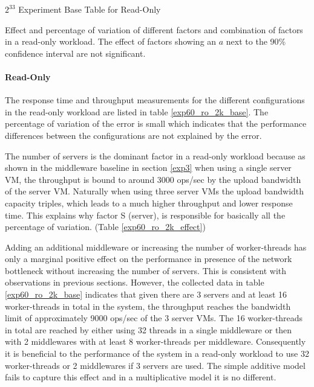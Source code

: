 \documentclass[report.tex]{subfiles}
\begin{document}
\begin{table}
	\centering
	\small{
		\setlength{\tabcolsep}{4.7pt}
		
		\caption{$2^33$ Experiment Base Table for Read-Only}\label{exp60_ro_2k_base} 
	}
\end{table}



\begin{table}
	\small{
		\centering
		\setlength{\tabcolsep}{4.5pt}
		\newcommand{\rlft}[0]{\raggedleft\arraybackslash}
		
		\caption{Effect and percentage of variation of different factors and combination of factors in a read-only workload. The effect of factors showing an $a$ next to the 90\% confidence interval are not significant.}\label{exp60_ro_2k_effect}
	}
\end{table}

\paragraph{Read-Only}

The response time and throughput measurements for the different configurations in the read-only workload are listed in table \ref{exp60_ro_2k_base}. The percentage of variation of the error is small which indicates that the performance differences between the configurations are not explained by the error. 

The number of servers is the dominant factor in a read-only workload because as shown in the middleware baseline in section \ref{exp3} when using a single server VM, the throughput is bound to around 3000 ops/sec by the upload bandwidth of the server VM. Naturally when using three server VMs the upload bandwidth capacity triples, which leads to a much higher throughput and lower response time. This explains why factor S (server), is responsible for basically all the percentage of variation. (Table \ref{exp60_ro_2k_effect})

Adding an additional middleware or increasing the number of worker-threads has only a marginal positive effect on the performance in presence of the network bottleneck without increasing the number of servers. This is consistent with observations in previous sections. 
However, the collected data in table \ref{exp60_ro_2k_base} indicates that given there are 3 servers and at least 16 worker-threads in total in the system, the throughput reaches the bandwidth limit of approximately 9000 ops/sec of the 3 server VMs. The 16 worker-threads in total are reached by either using 32 threads in a single middleware or then with 2 middlewares with at least 8 worker-threads per middleware.
Consequently it is beneficial to the performance of the system in a read-only workload to use 32 worker-threads or 2 middlewares if 3 servers are used.
The simple additive model fails to capture this effect and in a multiplicative model it is no different.
\end{document}
